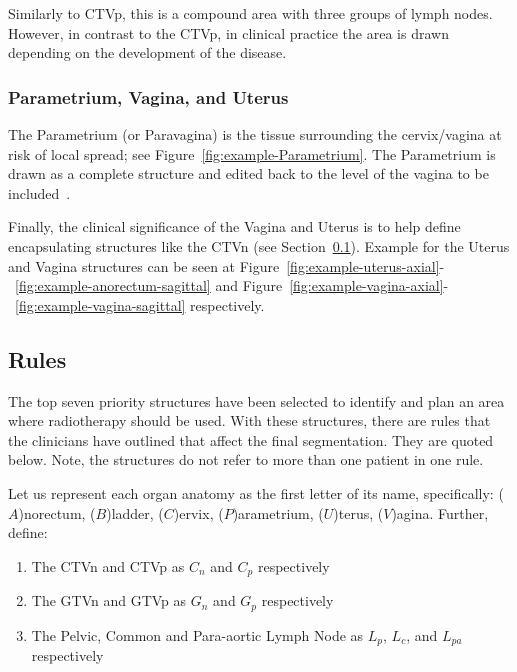 \documentclass[12pt,twoside]{report}
\begin{document}
Similarly to CTVp, this is a compound area with three groups of lymph nodes. However, in contrast to the CTVp, in clinical practice the area is drawn depending on the development of the disease.

\subsubsection{Parametrium, Vagina, and Uterus}\label{sec:data-Parametrium}

The Parametrium (or Paravagina) is the tissue surrounding the cervix/vagina at risk of local spread; see Figure~\ref{fig:example-Parametrium}. The Parametrium is drawn as a complete structure and edited back to the level of the vagina to be included~\cite{AMLART-data}.

Finally, the clinical significance of the Vagina and Uterus is to help define encapsulating structures like the CTVn (see Section~\ref{sec:rules}). Example for the Uterus and Vagina structures can be seen at Figure~\ref{fig:example-uterus-axial}-~\ref{fig:example-anorectum-sagittal} and Figure~\ref{fig:example-vagina-axial}-~\ref{fig:example-vagina-sagittal} respectively.

\subsection{Rules}\label{sec:rules}

The top seven priority structures have been selected to identify and plan an area where radiotherapy should be used. With these structures, there are rules that the clinicians have outlined that affect the final segmentation. They are quoted below. Note, the structures do not refer to more than one patient in one rule.

Let us represent each organ anatomy as the first letter of its name, specifically: ($A$)norectum, ($B$)ladder, ($C$)ervix, ($P$)arametrium, ($U$)terus, ($V$)agina. Further, define:

\begin{enumerate}
  \item The CTVn and CTVp as $C_n$ and $C_p$ respectively
  \item The GTVn and GTVp as $G_n$ and $G_p$ respectively
  \item The Pelvic, Common and Para-aortic Lymph Node as $L_p$, $L_c$, and $L_{pa}$ respectively
\end{enumerate}
\end{document}

